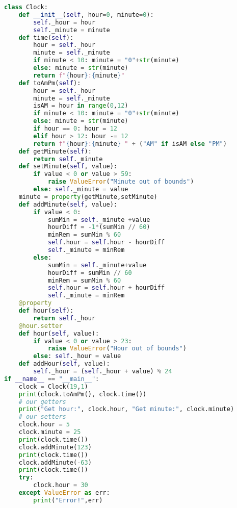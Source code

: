 \documentclass[12pt]{article}
\begin{document}
\begin{lstlisting}[language=Python]
class Clock:
    def __init__(self, hour=0, minute=0):
        self._hour = hour
        self._minute = minute
    def time(self):
        hour = self._hour
        minute = self._minute
        if minute < 10: minute = "0"+str(minute)
        else: minute = str(minute)
        return f"{hour}:{minute}"
    def toAmPm(self):
        hour = self._hour
        minute = self._minute
        isAM = hour in range(0,12)
        if minute < 10: minute = "0"+str(minute)
        else: minute = str(minute)
        if hour == 0: hour = 12
        elif hour > 12: hour -= 12
        return f"{hour}:{minute} " + ("AM" if isAM else "PM")
    def getMinute(self):
        return self._minute
    def setMinute(self, value):
        if value < 0 or value > 59:
            raise ValueError("Minute out of bounds")
        else: self._minute = value
    minute = property(getMinute,setMinute)
    def addMinute(self, value):
        if value < 0:
            sumMin = self._minute +value
            hourDiff = -1*(sumMin // 60)
            minRem = sumMin % 60
            self.hour = self.hour - hourDiff
            self._minute = minRem
        else:
            sumMin = self._minute+value
            hourDiff = sumMin // 60
            minRem = sumMin % 60
            self.hour = self.hour + hourDiff
            self._minute = minRem
    @property
    def hour(self):
        return self._hour
    @hour.setter
    def hour(self, value):
        if value < 0 or value > 23:
            raise ValueError("Hour out of bounds")           
        else: self._hour = value
    def addHour(self, value):
        self._hour = (self._hour + value) % 24
if __name__ == "__main__":
    clock = Clock(19,1)
    print(clock.toAmPm(), clock.time())
    # our getters
    print("Get hour:", clock.hour, "Get minute:", clock.minute)
    # our setters
    clock.hour = 5
    clock.minute = 25
    print(clock.time())
    clock.addMinute(123)
    print(clock.time())
    clock.addMinute(-63)
    print(clock.time())
    try:
        clock.hour = 30
    except ValueError as err:
        print("Error!",err)
\end{lstlisting}
\end{document}
